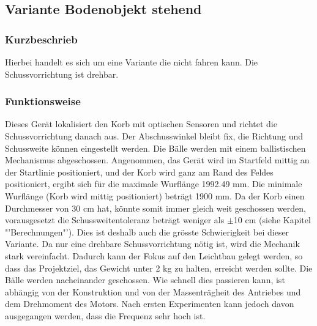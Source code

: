 

\clearpage

\subsection{Variante Bodenobjekt stehend}
\label{sec:var_bod_ste}
\subsubsection{Kurzbeschrieb}
Hierbei handelt es sich um eine Variante die nicht fahren kann. Die Schussvorrichtung ist drehbar.

\subsubsection{Funktionsweise}
Dieses Gerät lokalisiert den Korb mit optischen Sensoren und richtet die 
Schussvorrichtung danach aus. Der Abschusswinkel bleibt fix, die Richtung und 
Schussweite können eingestellt werden. Die Bälle werden mit einem 
ballistischen Mechanismus abgeschossen. Angenommen, das Gerät wird im Startfeld 
mittig an der Startlinie positioniert, und der Korb wird ganz am Rand des 
Feldes positioniert, ergibt sich für die maximale Wurflänge 1992.49 mm. Die 
minimale Wurflänge (Korb wird mittig positioniert) beträgt 1900 mm. Da der Korb 
einen Durchmesser von 30 cm hat, könnte somit immer gleich weit geschossen 
werden, vorausgesetzt die Schussweitentoleranz beträgt weniger als $\pm$10 cm 
(siehe Kapitel "'Berechnungen"'). Dies ist deshalb auch die grösste 
Schwierigkeit bei dieser Variante. Da nur eine drehbare Schussvorrichtung nötig 
ist, wird die Mechanik stark vereinfacht. Dadurch kann der Fokus auf den 
Leichtbau gelegt werden, so dass das Projektziel, das Gewicht unter 2 kg zu 
halten, erreicht werden sollte. Die Bälle werden nacheinander geschossen. Wie 
schnell dies passieren kann, ist abhängig von der Konstruktion und von der 
Massenträgheit des Antriebes und dem Drehmoment des Motors. Nach ersten 
Experimenten kann jedoch davon ausgegangen werden, dass die Frequenz sehr hoch 
ist.

